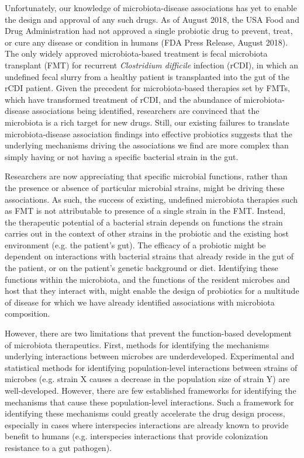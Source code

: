 \documentclass[11pt,twocolumn,notitlepage,openany,twoside]{book}
\begin{document}
\begin{refsection}
Unfortunately, our knowledge of microbiota-disease associations has yet to enable the design and approval of any such drugs. As of August 2018, the USA Food and Drug Administration had not approved a single probiotic drug to prevent, treat, or cure any disease or condition in humans (FDA Press Release, August 2018). The only widely approved microbiota-based treatment is fecal microbiota transplant (FMT) for recurrent \textit{Clostridium difficile} infection (rCDI), in which an undefined fecal slurry from a healthy patient is transplanted into the gut of the rCDI patient. Given the precedent for microbiota-based therapies set by FMTs, which have transformed treatment of rCDI, and the abundance of microbiota-disease associations being identified, researchers are convinced that the microbiota is a rich target for new drugs. Still, our existing failures to translate microbiota-disease association findings into effective probiotics suggests that the underlying mechanisms driving the associations we find are more complex than simply having or not having a specific bacterial strain in the gut.

Researchers are now appreciating that specific microbial functions, rather than the presence or absence of particular microbial strains, might be driving these associations. As such, the success of existing, undefined microbiota therapies such as FMT is not attributable to presence of a single strain in the FMT. Instead, the therapeutic potential of a bacterial strain depends on functions the strain carries out in the context of other strains in the probiotic and the existing host environment (e.g. the patient’s gut). The efficacy of a probiotic might be dependent on interactions with bacterial strains that already reside in the gut of the patient, or on the patient’s genetic background or diet. Identifying these functions within the microbiota, and the functions of the resident microbes and host that they interact with, might enable the design of probiotics for a multitude of disease for which we have already identified associations with microbiota composition.

However, there are two limitations that prevent the function-based development of microbiota therapeutics. First, methods for identifying the mechanisms underlying interactions between microbes are underdeveloped. Experimental and statistical methods for identifying population-level interactions between strains of microbes (e.g. strain X causes a decrease in the population size of strain Y) are well-developed. However, there are few established frameworks for identifying the mechanisms that cause these population-level interactions. Such a framework for identifying these mechanisms could greatly accelerate the drug design process, especially in cases where interspecies interactions are already known to provide benefit to humans (e.g. interspecies interactions that provide colonization resistance to a gut pathogen).


\end{refsection}
\end{document}
